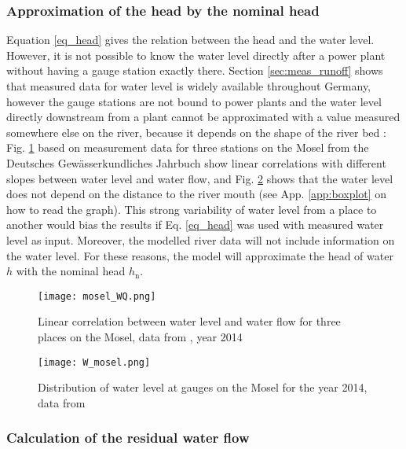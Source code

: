 \subsubsection{Approximation of the head by the nominal head}
\label{sub:approx_h}

Equation \eqref{eq_head} gives the relation between the head and the water level. However, it is not possible to know the water level directly after a power plant without having a gauge station exactly there. Section \ref{sec:meas_runoff} shows that measured data for water level is widely available throughout Germany, however the gauge stations are not bound to power plants and the water level directly downstream from a plant cannot be approximated with a value measured somewhere else on the river, because it depends on the shape of the river bed : Fig. \ref{mosel_WQ} based on measurement data for three stations on the Mosel from the Deutsches Gewässerkundliches Jahrbuch show linear correlations with different slopes between water level and water flow, and Fig. \ref{W_mosel} shows that the water level does not depend on the distance to the river mouth (see App. \ref{app:boxplot} on how to read the graph). \newline
This strong variability of water level from a place to another would bias the results if Eq. \eqref{eq_head} was used with measured water level as input. Moreover, the modelled river data will not include information on the water level. For these reasons, the model will approximate the head of water $h$ with the nominal head $h_\mathrm{n}$.

\begin{figure}[H]
\centering
\texttt{[image: mosel\_WQ.png]}
\caption[Linear correlation between water level and  water flow for three places on the Mosel]{Linear correlation between water level and water flow for three places on the Mosel, data from \cite{dgj}, year 2014}
\label{mosel_WQ}
\end{figure}


\begin{figure}[H]
\centering
\texttt{[image: W\_mosel.png]}
\caption[Distribution of water level at gauges on the Mosel]{Distribution of water level at gauges on the Mosel for the year 2014, data from \cite{dgj}}
\label{W_mosel}
\end{figure}

\subsubsection{Calculation of the residual water flow}
\label{sub:extrapol_dV_res}

